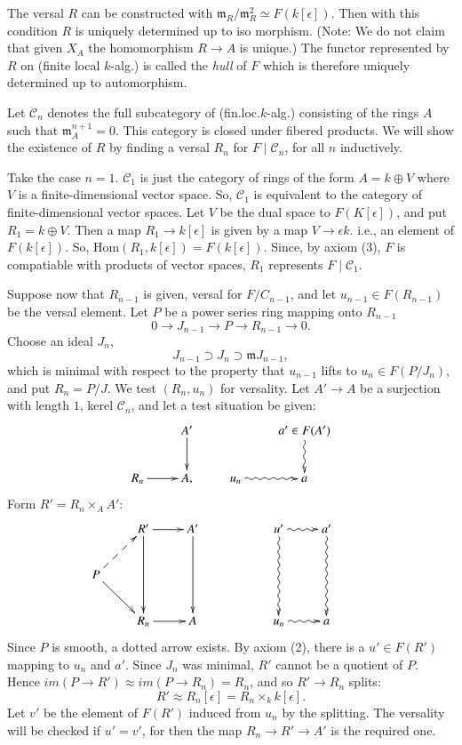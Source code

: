 {\begin{remark}\label{part1-rem7.2}%
  The versal $R$ can be constructed with
  $\mathfrak{m}_{R}/\mathfrak{m}_{R}^{2}\simeq F(k[\epsilon])$. Then
  with this condition $R$ is uniquely determined up to iso
  morphism. (Note:  We do not claim that given $X_A$ the homomorphism
  $R\to A$ is unique.) The functor represented by $R$ on (finite local
  $k$-alg.) is called the {\em hull} of $F$ which is therefore
  uniquely determined up to automorphism. 
\end{remark}

\begin{prfthm}
Let $\mathscr{C}_{n}$ denotes the full subcategory of
(fin.loc.$k$-alg.) consisting of the rings $A$ such that
$\mathfrak{m}^{n+1}_{A}=0$. This category is closed under fibered
products. We will show the existence of $R$ by finding a versal $R_n$
for $F\mid \mathscr{C}_{n}$, for all $n$ inductively. 

Take the case $n=1$. $\mathscr{C}_{1}$ is just the category of rings
of the form $A=k\oplus V$ where $V$ is a finite-dimensional vector
space. So, $\mathscr{C}_{1}$ is equivalent to the category of
finite-dimensional vector spaces. Let $V$ be the dual space to
$F(K[\epsilon])$, and put $R_1=k\oplus V$. Then a map $R_1\to
k[\epsilon]$ is given by a map $V \to \epsilon k$. i.e., an element of
$F(k[\epsilon])$. So, $\text{Hom}(R_1,
k[\epsilon])=F(k[\epsilon])$. Since, by axiom (3), $F$ is compatiable
with products of vector spaces, $R_1$ represents
$F\mid \mathscr{C}_{1}$. 

Suppose now that $R_{n-1}$ is given, versal for $F/C_{n-1}$, and let
$u_{n-1}\in F(R_{n-1})$ be the versal element. Let $P$ be a power
series ring mapping onto $R_{n-1}$ 
$$
0\to J_{n-1}\to P\to R_{n-1}\to 0.
$$
Choose an ideal $J_n$,
$$
J_{n-1}\supset J_n\supset\mathfrak{m} J_{n-1},
$$\pageoriginale
which is minimal with respect to the property that $u_{n-1}$ lifts to
$u_n\in F(P/J_n)$, and put $R_{n}=P/J$. We test $(R_{n}, u_{n})$ for
versality. Let $A'\to A$ be a surjection with length $1$, kerel
$\mathscr{C}_{n}$, and let a test situation be given: 
\begin{equation*}
\vcenter{
\xymatrix{
& A'\ar [d] & & a'\in \ar @ {~>}[d] F(A')\\
R_n\ar [r]&A, &  u_n\ar @ {~>}[r] &a
}}
\end{equation*}
Form $R'=R_n\times_A A':$
\begin{equation*}
\vcenter{
\xymatrix{
&R'\ar [dd]\ar[r]&A'\ar [dd]&  &  u'\ar @ {~>}[dd]\ar @{~>}[r]& a'\ar @ {~>}[dd]&\\
P\ar @ {-->}[ur]\ar[dr]& &  & & &\\
&R_n\ar [r]&A& &  u_n\ar @ {~>}[r]& a &
}}
\end{equation*}
Since $P$ is smooth, a dotted arrow exists. By axiom (2), there is  a
$u'\in F(R')$ mapping to $u_n$ and $a'$. Since $J_n$ was minimal, $R'$
cannot be a quotient of $P$. Hence $im(P \to R')\approx im(P\to
R_n)=R_n$, and so $R'\to R_n$ splits: 
$$
R'\approx R_n[\epsilon]=R_n\times_k k[\epsilon].
$$ 
Let $v'$ be the element of $F(R')$ induced from $u_n$ by the
splitting. The versality will be checked if $u'=v'$, for then the map
$R_n\to R'\to A'$ is the required one. 


\end{prfthm}}
